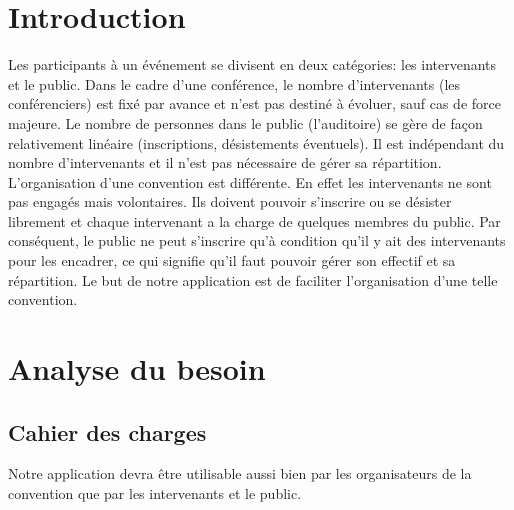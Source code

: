 \documentclass[11pt]{article}
\begin{document}

\renewcommand{\contentsname}{Sommaire}
\tableofcontents
\newpage



\section*{Introduction}

Les participants à un événement se divisent en deux catégories: les intervenants et le public. Dans le cadre d'une conférence, le nombre d'intervenants (les conférenciers) est fixé par avance et n'est pas destiné à évoluer, sauf cas de force majeure. Le nombre de personnes dans le public (l'auditoire) se gère de façon relativement linéaire (inscriptions, désistements éventuels). Il est indépendant du nombre d'intervenants et il n'est pas nécessaire de gérer sa répartition.\\

L'organisation d'une convention est différente. En effet les intervenants ne sont pas engagés mais volontaires. Ils doivent pouvoir s'inscrire ou se désister librement et chaque intervenant a la charge de quelques membres du public. Par conséquent, le public ne peut s'inscrire qu'à condition qu'il y ait des intervenants pour les encadrer, ce qui signifie qu'il faut pouvoir gérer son effectif et sa répartition. Le but de notre application est de faciliter l'organisation d'une telle convention. \\



\newpage


\section{Analyse du besoin}

\subsection{Cahier des charges}
Notre application devra être utilisable aussi bien par les organisateurs de la convention que par les intervenants et le public.  \\
\end{document}
